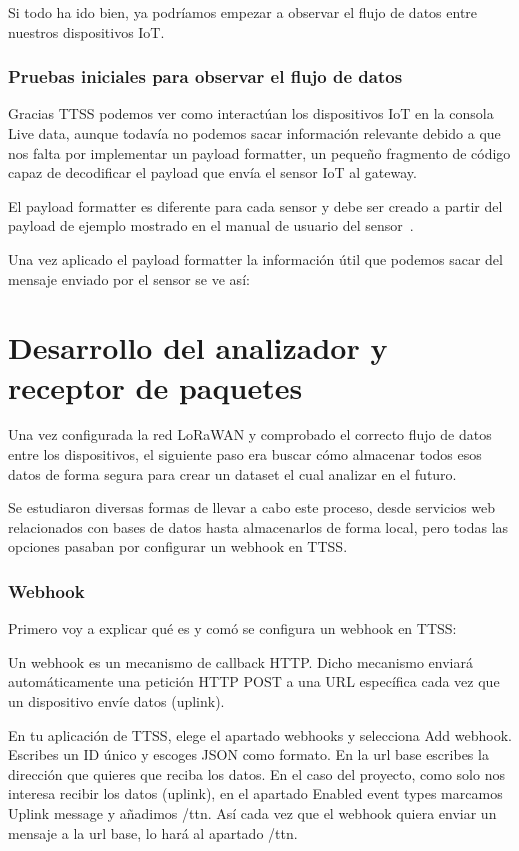Si todo ha ido bien, ya podríamos empezar a observar el flujo de datos entre nuestros dispositivos IoT.

\subsubsection{Pruebas iniciales para observar el flujo de datos}
Gracias TTSS podemos ver como interactúan los dispositivos IoT en la consola Live data, aunque todavía no podemos sacar información relevante debido a que nos falta por implementar un payload formatter, un pequeño fragmento de código capaz de decodificar el payload que envía el sensor IoT al gateway.

El payload formatter es diferente para cada sensor y debe ser creado a partir del payload de ejemplo mostrado en el manual de usuario del sensor~\cite{MerryIoT:manual}.


Una vez aplicado el payload formatter la información útil que podemos sacar del mensaje enviado por el sensor se ve así:



\section{Desarrollo del analizador y receptor de paquetes }
Una vez configurada la red LoRaWAN y comprobado el correcto flujo de datos entre los dispositivos, el siguiente paso era buscar cómo almacenar todos esos datos de forma segura para crear un dataset el cual analizar en el futuro.

Se estudiaron diversas formas de llevar a cabo este proceso, desde servicios web relacionados con bases de datos hasta almacenarlos de forma local, pero todas las opciones pasaban por configurar un webhook en TTSS.
\subsubsection{Webhook}

Primero voy a explicar qué es y comó se configura un webhook en TTSS:

Un webhook es un mecanismo de callback HTTP. Dicho mecanismo enviará automáticamente una petición HTTP POST a una URL específica cada vez que un dispositivo envíe datos (uplink).

En tu aplicación de TTSS, elege el apartado webhooks y selecciona Add webhook. Escribes un ID único y escoges JSON como formato. En la url base escribes la dirección que quieres que reciba los datos. En el caso del proyecto, como solo nos interesa recibir los datos (uplink), en el apartado Enabled event types marcamos Uplink message y añadimos /ttn. Así cada vez que el webhook quiera enviar un mensaje a la url base, lo hará al apartado /ttn. 

